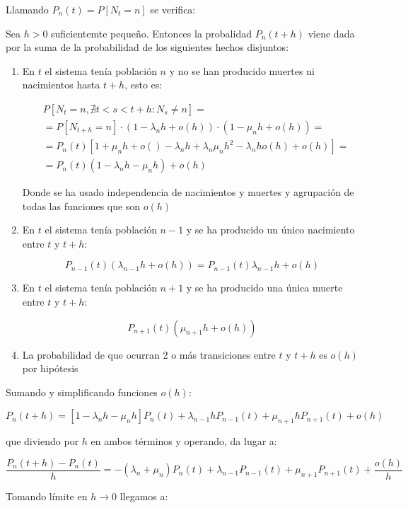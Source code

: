 \documentclass[a4paper,10pt]{scrartcl}
\theoremstyle{definition}
\numberwithin{equation}{section}
\begin{document}
Llamando $P_n(t) = P[N_t = n]$ se verifica:

Sea $h>0$ suficientemte pequeño. Entonces la probalidad $P_n(t+h)$ viene dada por la suma de la probabilidad de 
los siguientes hechos disjuntos:

\begin{enumerate}
 \item En $t$ el sistema tenía población $n$ y no se han producido muertes ni nacimientos hasta $t+h$, esto es:
 
 \begin{align*}
  &P[N_{t} = n, \nexists t<s<t+h: N_{s} \neq n] =\\
  &= P[N_{t+h}=n] \cdot (1-\lambda_n h + o(h)) \cdot (1-\mu_n h + o(h))= \\
  &= P_n(t)[1+\mu_n h + o() -\lambda_n h + \lambda_n \mu_n h^2 - \lambda_n h o(h) + o(h)] = \\
  &= P_n(t)(1-\lambda_n h - \mu_n h) + o(h)
 \end{align*}
 
 Donde se ha usado independencia de nacimientos y muertes y agrupación de todas las funciones que son $o(h)$
 
 \item En $t$ el sistema tenía población $n-1$ y se ha producido un único nacimiento entre $t$ y $t+h$:
 
 \[P_{n-1}(t) (\lambda_{n-1}h + o(h)) = P_{n-1}(t) \lambda_{n-1} h + o(h)\]
 
 \item En $t$ el sistema tenía población $n+1$ y se ha producido una única muerte entre $t$ y $t+h$:
 
 \[P_{n+1}(t) (\mu_{n+1} h + o(h))\]
 
 \item La probabilidad de que ocurran 2 o más transiciones entre $t$ y $t+h$ es $o(h)$ por hipótesis
\end{enumerate}


Sumando y simplificando funciones $o(h)$:

\[P_n(t+h) = [1-\lambda_n h -\mu_n h] P_n(t) + \lambda_{n-1} h P_{n-1}(t) + \mu_{n+1} h P_{n+1}(t) + o(h)\]


que diviendo por $h$ en ambos términos y operando, da lugar a:

\[\frac{P_n(t+h) - P_n(t)}{h} = -(\lambda_n + \mu_n) P_n(t) + \lambda_{n-1} P_{n-1}(t) + \mu_{n+1}P_{n+1}(t) + \frac{o(h)}{h}\]

Tomando límite en $h\rightarrow 0$ llegamos a:
\end{document}
